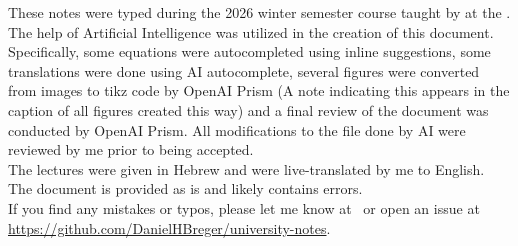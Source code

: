 \begin{myminipage}
	These notes were typed during the 2026 winter semester \textit{\courseloc} course taught by \profloc{} at the \instituteloc{}. 
	\bigskip \\ The help of Artificial Intelligence was utilized in the creation of this document. Specifically, some equations were autocompleted using inline suggestions, some translations were done using AI autocomplete, several figures were converted from images to tikz code by OpenAI Prism (A note indicating this appears in the caption of all figures created this way) and a final review of the document was conducted by OpenAI Prism. All modifications to the file done by AI were reviewed by me prior to being accepted. \bigskip \\ The lectures were given in Hebrew and were live-translated by me to English. The document is provided as is and likely contains errors. 
	\bigskip \\ If you find any mistakes or typos, please let me know at \myemailloc\ or open an issue at \url{https://github.com/DanielHBreger/university-notes}.
\end{myminipage}
